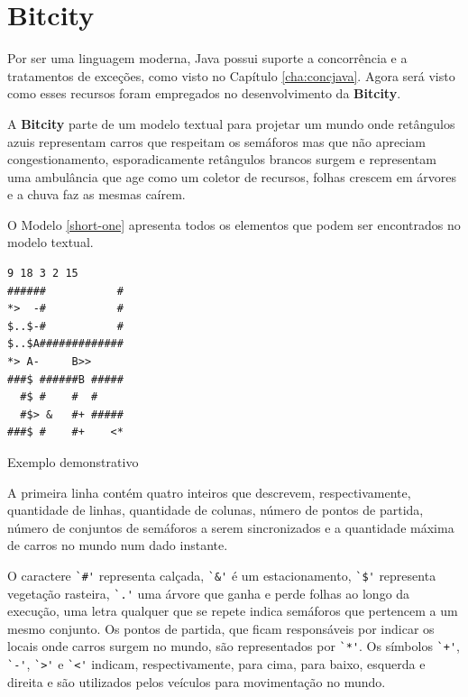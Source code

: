 \chapter{Bitcity}

Por ser uma linguagem moderna, Java possui suporte a concorrência e a
tratamentos de exceções, como visto no Capítulo \ref{cha:concjava}. Agora 
será visto como esses recursos foram empregados no desenvolvimento da
\textbf{Bitcity}.

A \textbf{Bitcity} parte de um modelo textual para projetar um mundo
onde retângulos azuis representam carros que respeitam os semáforos
mas que não apreciam congestionamento, esporadicamente
retângulos brancos surgem e representam uma ambulância que age como um
coletor de recursos, folhas crescem em árvores e a chuva faz as mesmas
caírem.

O Modelo \ref{short-one} apresenta todos os elementos que podem ser
encontrados no modelo textual.

\begin{model}
\centering
\begin{BVerbatim}
9 18 3 2 15
######           #
*>  -#           #
$..$-#           # 
$..$A#############
*> A-     B>>
###$ ######B #####
  #$ #    #  #    
  #$> &   #+ #####
###$ #    #+    <*
\end{BVerbatim}
  \caption{Exemplo demonstrativo \label{short-one}}
\end{model}

A primeira linha contém quatro inteiros que descrevem, respectivamente,
quantidade de linhas, quantidade de colunas, número de pontos de
partida, número de conjuntos de semáforos a serem sincronizados e a
quantidade máxima de carros no mundo num dado instante.

O caractere \verb!`#'! representa calçada, \verb!`&'! é um
estacionamento, \verb!`$'! representa
vegetação rasteira, \verb!`.'! uma árvore que ganha e perde folhas ao
longo da execução, uma letra qualquer que se repete indica semáforos
que pertencem a um mesmo conjunto. Os pontos de partida, que ficam
responsáveis por indicar os locais onde carros surgem no mundo, são
representados por \verb!`*'!. Os símbolos \verb!`+'!, \verb!`-'!,
\verb!`>'! e \verb!`<'! indicam, respectivamente, para cima, para
baixo, esquerda e direita e são utilizados pelos veículos para
movimentação no mundo.


